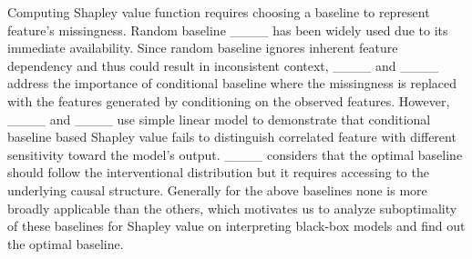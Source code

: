 Computing Shapley value function requires choosing a baseline to represent feature’s missingness. Random baseline ____ has been widely used due to its immediate availability. Since random baseline ignores inherent feature dependency and thus could result in inconsistent context, ____ and ____ address the importance of conditional baseline where the missingness is replaced with the features generated by conditioning on the observed features. However, ____ and ____ use simple linear model to demonstrate that conditional baseline based Shapley value fails to distinguish correlated feature with different sensitivity toward the model’s output. ____ considers that the optimal baseline should follow the interventional distribution but it requires accessing to the underlying causal structure. Generally for the above baselines none is more broadly applicable than the others, which motivates us to analyze suboptimality of these baselines for Shapley value on interpreting black-box models and find out the optimal baseline.